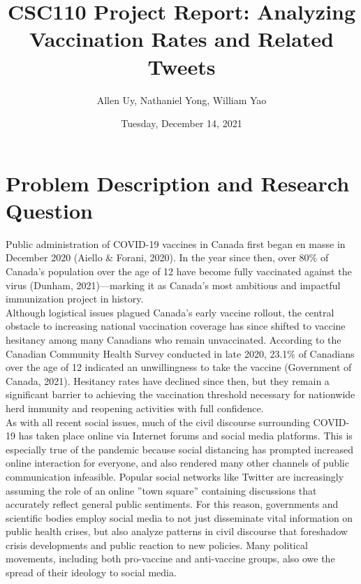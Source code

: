 \documentclass[fontsize=11pt]{article}
\title{CSC110 Project Report: Analyzing Vaccination Rates and Related Tweets }
\author{Allen Uy, Nathaniel Yong, William Yao}
\date{Tuesday, December 14, 2021}
\begin{document}
\maketitle

\section*{Problem Description and Research Question}

Public administration of COVID-19 vaccines in Canada first began en masse in December 2020 (Aiello \& Forani, 2020). In the year since then, over 80\% of Canada’s population over the age of 12 have become fully vaccinated against the virus (Dunham, 2021)—marking it as Canada’s most ambitious and impactful immunization project in history. \\

Although logistical issues plagued Canada’s early vaccine rollout, the central obstacle to increasing national vaccination coverage has since shifted to vaccine hesitancy among many Canadians who remain unvaccinated. According to the Canadian Community Health Survey conducted in late 2020, 23.1\% of Canadians over the age of 12 indicated an unwillingness to take the vaccine (Government of Canada, 2021). Hesitancy rates have declined since then, but they remain a significant barrier to achieving the vaccination threshold necessary for nationwide herd immunity and reopening activities with full confidence.\\

As with all recent social issues, much of the civil discourse surrounding COVID-19 has taken place online via Internet forums and social media platforms. This is especially true of the pandemic because social distancing has prompted increased online interaction for everyone, and also rendered many other channels of public communication infeasible. Popular social networks like Twitter are increasingly assuming the role of an online ”town square” containing discussions that accurately reflect general public sentiments. For this reason, governments and scientific bodies employ social media to not just disseminate vital information on public health crises, but also analyze patterns in civil discourse that foreshadow crisis developments and public reaction to new policies. Many political movements, including both pro-vaccine and anti-vaccine groups, also owe the spread of their ideology to social media.\\
\end{document}
